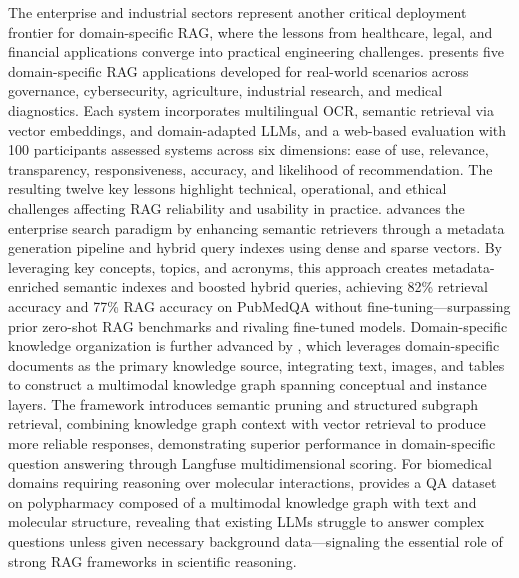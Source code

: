 \documentclass[11pt]{article}
\begin{document}
The enterprise and industrial sectors represent another critical deployment frontier for domain-specific RAG, where the lessons from healthcare, legal, and financial applications converge into practical engineering challenges. \cite{ref401} presents five domain-specific RAG applications developed for real-world scenarios across governance, cybersecurity, agriculture, industrial research, and medical diagnostics. Each system incorporates multilingual OCR, semantic retrieval via vector embeddings, and domain-adapted LLMs, and a web-based evaluation with 100 participants assessed systems across six dimensions: ease of use, relevance, transparency, responsiveness, accuracy, and likelihood of recommendation. The resulting twelve key lessons highlight technical, operational, and ethical challenges affecting RAG reliability and usability in practice. \cite{ref402} advances the enterprise search paradigm by enhancing semantic retrievers through a metadata generation pipeline and hybrid query indexes using dense and sparse vectors. By leveraging key concepts, topics, and acronyms, this approach creates metadata-enriched semantic indexes and boosted hybrid queries, achieving 82\% retrieval accuracy and 77\% RAG accuracy on PubMedQA without fine-tuning---surpassing prior zero-shot RAG benchmarks and rivaling fine-tuned models. Domain-specific knowledge organization is further advanced by \cite{ref56}, which leverages domain-specific documents as the primary knowledge source, integrating text, images, and tables to construct a multimodal knowledge graph spanning conceptual and instance layers. The framework introduces semantic pruning and structured subgraph retrieval, combining knowledge graph context with vector retrieval to produce more reliable responses, demonstrating superior performance in domain-specific question answering through Langfuse multidimensional scoring. For biomedical domains requiring reasoning over molecular interactions, \cite{ref55} provides a QA dataset on polypharmacy composed of a multimodal knowledge graph with text and molecular structure, revealing that existing LLMs struggle to answer complex questions unless given necessary background data---signaling the essential role of strong RAG frameworks in scientific reasoning.
\end{document}
